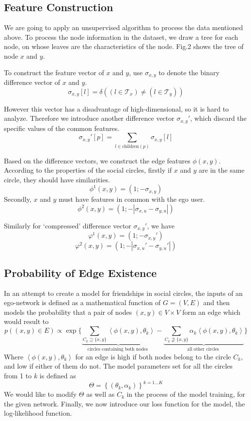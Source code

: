 \documentclass[12pt,a4paper]{article}
\begin{document}
\subsection*{Feature Construction}
\par We are going to apply an unsupervised algorithm to process the data mentioned above. To process the node information in the dataset, we draw a tree for each node, on whose leaves are the characteristics of the node. Fig.2 shows the tree of node $x$ and $y$. \\
\par To construct the feature vector of $x$ and $y$, use $\sigma_{x,y}$ to denote the binary difference vector of $x$ and $y$.  
\[
    \sigma_{x,y}\left[l\right]=\delta\left(\left(l\in \mathcal{T}_x\right) \neq \left(l\in \mathcal{T}_y\right) \right)
\]
\par However this vector has a disadvantage of high-dimensional, so it is hard to analyze. Therefore we introduce another difference vector $\sigma_{x,y}'$, which discard the specific values of the common features.
\[
    \sigma_{x,y}'\left[p\right]=\sum_{l\in \text{children}(p)}\sigma_{x,y}\left[l\right]
\]
\par Based on the difference vectors, we construct the edge features $\phi(x, y)$. According to the properties of the social circles, firstly if $x$ and $y$ are in the same circle, they should have similarities.
\[
    \phi^1(x,y) = \left(1;-\sigma_{x,y}\right)
\]
Secondly, $x$ and $y$ must have features in common with the ego user.
\[
    \phi^2(x,y) = \left(1;-|\sigma_{x,u}-\sigma_{y,u}|\right)
\]
\par Similarly for `compressed' difference vector $\sigma_{x,y}'$, we have
\[
    \varphi^1(x,y) = \left(1;-\sigma_{x,y}'\right)
\]
\[
    \varphi^2(x,y) = \left(1;-|\sigma_{x,u}'-\sigma_{y,u}'|\right)
\]
\subsection*{Probability of Edge Existence}
\par In an attempt to create a model for friendships in social circles, the inputs of an ego-network is defined as a mathematical function of $G = (V, E)$ and then models the probability that a pair of nodes $(x, y) \in V \times V$ form an edge which would result to
\[
    p((x, y) \in E) \propto \exp \{\underbrace{\sum_{C_{k} \supseteq\{x, y\}}\left\langle\phi(x, y), \theta_{k}\right\rangle}_{\text {circles containing both nodes }}-\underbrace{\sum_{C_{k} \nsupseteq\{x, y\}} \alpha_{k}\left\langle\phi(x, y), \theta_{k}\right\rangle}_{\text {all other circles }}\}
\]
Where $\left\langle\phi(x, y), \theta_{k}\right\rangle$ for an edge is high if both nodes belong to the circle $C_k$, and low if either of them do not.
The model parameters set for all the circles from 1 to $k$ is defined as 
\[
    \Theta=\left\{\left(\theta_{k}, \alpha_{k}\right)\right\}^{k=1 \ldots K}
\]
We would like to modify $\Theta$ as well as $C_k$ in the process of the model training, for the given network.
Finally, we now introduce our loss function for the model, the log-likelihood function.
\end{document}
